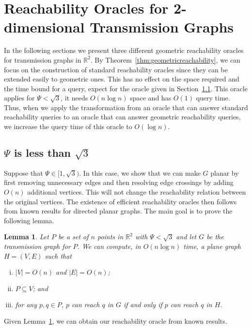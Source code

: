 \documentclass[11pt,a4paper]{paper}
\newtheorem{lemma}[theorem]{Lemma}
\newcommand{\mathset}[1]{\ensuremath {\mathbb {#1}}}
\newcommand{\R}{\mathset{R}}
\begin{document}
\section{Reachability Oracles for 2-dimensional Transmission Graphs}
\label{sec:2d}
In the following sections we present three different geometric reachability
oracles for
transmission graphs in $\R^2$. By Theorem~\ref{thm:geometricreachability}, we
can focus on the construction of standard reachability oracles since they can
be extended easily to geometric ones. This has no effect on the space required and the time bound for a
query, expect for the oracle given
in Section~\ref{sec:psisqrt3}. This oracle  applies for $\Psi < \sqrt{3}$, it needs  $O(n
\log n)$ space and has $O(1)$ query time.
Thus, when we apply the transformation from an oracle that can answer standard reachability queries to
an oracle that can answer geometric reachability queries, we increase the query time of this oracle to $O(\log n)$.

\subsection{$\Psi$ is
less than $\sqrt{3}$}
\label{sec:psisqrt3}
Suppose that $\Psi \in [1,\sqrt{3})$. In this case, we show that
we can make $G$ planar by
first removing unnecessary edges and then resolving edge crossings
by adding $O(n)$ additional vertices.
This will not change the reachability relation between
the original vertices. The existence of efficient reachability
oracles then follows from known results for directed planar graphs.
The main goal is to prove the following lemma.

\begin{lemma}\label{lem:planarization}
Let $P$ be a set of $n$ points in $\R^2$ with $\Psi < \sqrt{3}$ and let
$G$ be the transmission graph for  $P$. We can compute, in  $O(n \log n)$ time,
 a plane
graph $H = (V, E)$ such that
\begin{enumerate}[(i)]
\item $|V| = O(n)$ and $|E| = O(n)$;
\item $P \subseteq V$; and
\item for any $p,q \in P$, $p$ can reach $q$ in $G$ if and only if $p$ can
reach $q$ in $H$.
\end{enumerate}
\end{lemma}
Given Lemma~\ref{lem:planarization}, we can obtain our reachability
oracle from known results.
\end{document}
